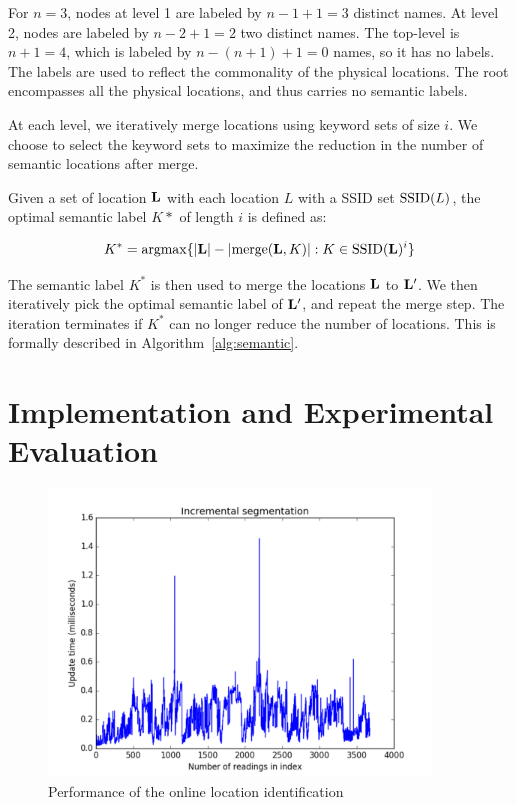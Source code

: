 For $n=3$, nodes at level 1 are labeled by $n-1+1=3$ distinct names.  At level
2, nodes are labeled by $n-2+1=2$ two distinct names.  The top-level is $n+1=4$,
which is labeled by $n-(n+1)+1 = 0$ names, so it has no labels.
The labels are used to reflect the commonality of the physical locations.
The root encompasses all the physical locations, and thus carries no semantic
labels.

At each level,  we iteratively merge locations using keyword sets of size
$i$.  We choose to select the keyword sets 
to maximize the reduction in the number of semantic locations after
merge.

Given a set of location $\mathbf{L}$ with each location $L$ with a SSID set $\mathrm{SSID}(L)$,
the optimal semantic label $K*$ of length $i$ is defined as:

$$ K^* = \mathrm{argmax} \{|\mathbf{L}| - |\mathrm{merge}(\mathbf{L}, K)| : K\in\mathrm{SSID}(\mathbf{L})^i\}$$

The semantic label $K^*$ is then used to merge the locations $\mathbf{L}$ to $\mathbf{L}'$.  We then
iteratively pick the optimal semantic label of $\mathbf{L}'$, and repeat the merge
step.  The iteration terminates if $K^*$ can no longer reduce the number of locations.
This is formally described in Algorithm~\ref{alg:semantic}.

\section{Implementation and Experimental Evaluation}

\begin{figure}[t]
    \centering
    \includegraphics[width=4in]{../plots/incremental.pdf}
    \caption{Performance of the online location identification}
    \label{fig:incremental}
\end{figure}
